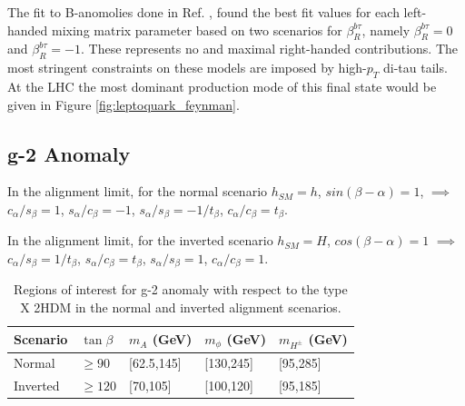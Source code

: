 The fit to B-anomolies done in Ref. \cite{leptoquark}, found the best fit values for each left-handed mixing matrix parameter based on two scenarios for $\beta^{b\tau}_{R}$, namely $\beta^{b\tau}_{R} = 0$ and $\beta^{b\tau}_{R} = -1$. These represents no and maximal right-handed contributions. The most stringent constraints on these models are imposed by high-$p_{T}$ di-tau tails. At the LHC the most dominant production mode of this final state would be given in Figure \ref{fig:leptoquark_feynman}.

\subsection{g-2 Anomaly}

In the alignment limit, for the normal scenario $h_{SM}=h$, $sin(\beta-\alpha)=1$, $\implies$ $c_{\alpha}/s_{\beta}=1$, $s_{\alpha}/c_{\beta}=-1$, $s_{\alpha}/s_{\beta}=-1/t_{\beta}$, $c_{\alpha}/c_{\beta}=t_{\beta}$.

In the alignment limit, for the inverted scenario $h_{SM}=H$, $cos(\beta-\alpha)=1$ $\implies$ $c_{\alpha}/s_{\beta}=1/t_{\beta}$, $s_{\alpha}/c_{\beta}=t_{\beta}$, $s_{\alpha}/s_{\beta}=1$, $c_{\alpha}/c_{\beta}=1$.


\begin{table}[H]
    \centering
    \begin{tabular}{|p{1.5cm}|x{2.2cm}x{2.2cm}x{2.2cm}x{2.2cm}|}
         \hline
         Scenario & $\tan\beta$ & $m_{A}$ (GeV) & $m_{\phi}$ (GeV) & $m_{H^{\pm}}$ (GeV) \\
         \hline
         \hline
         Normal & $\geq 90$ & [62.5,145] & [130,245] & [95,285] \\
         Inverted & $\geq 120$ & [70,105] & [100,120] & [95,185] \\
         \hline
    \end{tabular}
    \caption{Regions of interest for g-2 anomaly with respect to the type X 2HDM in the normal and inverted alignment scenarios.}
    \label{tab:gm2region}
\end{table}